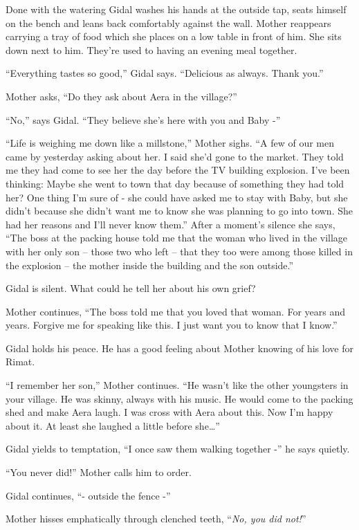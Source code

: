 \documentclass[twoside,11pt]{book}
\begin{document}
Done with the watering Gidal washes his hands at the outside tap, seats himself on the bench and leans back
comfortably against the wall. Mother reappears carrying a tray of food which she places on a low table in front of him.
She sits down next to him. They're used to having an evening meal together.

``Everything tastes so good,'' Gidal says. ``Delicious as always. Thank
you.''

Mother asks, ``Do they ask about Aera in the village?''

``No,'' says Gidal. ``They believe she's here with you and Baby -''

``Life is weighing me down{ }like a millstone,''
Mother sighs. ``A few of our men came by yesterday asking about her. I said she'd gone to the market. They
told me they had come to see her the day before the TV building explosion. I've been thinking: Maybe she went to town
that day because of something they had told her?  One thing I'm sure of - she could have asked me to stay with Baby,
but she didn't because she didn't want me to know she was planning to go into town. She had her reasons and I'll never
know them.'' After a moment's silence she says, ``The boss at the packing house told me that the woman who
lived in the village with her only son -- those two who left -- that they too were among those killed in the explosion
-- the mother inside the building and the son outside.''

Gidal is silent. What could he tell her about his own grief?

Mother continues, ``The boss told me that you loved that woman. For years and years. Forgive me for
speaking like this. I just want you to know that I know.''

Gidal holds his peace. He has a good feeling about Mother knowing of his love for Rimat.

``I remember her son,'' Mother continues. ``He wasn't like the other youngsters
in your village. He was skinny, always with his{ music}. He would come to the
packing shed and make Aera laugh. I was cross with Aera about this. Now I'm happy about it. At least she laughed a
little before she{\ldots}''

Gidal yields to temptation, ``I once saw them walking together -'' he says quietly.

``You never did!'' Mother calls him to order.

Gidal continues, ``- outside the fence -''

Mother hisses emphatically through clenched teeth, ``\textit{No, you did not!}''
\end{document}
